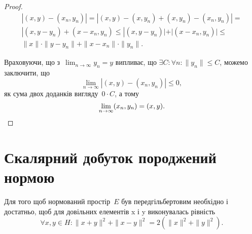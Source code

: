 \begin{proof}
\begin{multline*}
    |(x, y) - (x_n, y_n)| =
    |(x, y) - (x, y_n) + (x, y_n) - (x_n, y_n)| =  \\
    |(x, y - y_n) + (x - x_n, y_n) \le
    |(x, y - y_n)| + |(x - x_n, y_n)| \le \\
    \|x\| \cdot \|y - y_n\| + \|x - x_n\| \cdot \|y_n\|.
\end{multline*}

Враховуючи, що з~$\lim_{n \to \infty} y_n = y$ випливає, що 
$\exists C: \forall n: \|y_n\| \le C$, можемо заключити, що
\begin{equation*}
    \lim_{n \to \infty}  |(x, y) - (x_n, y_n)| \le 0,
\end{equation*}
як сума двох доданків вигляду~$0 \cdot C$, а тому
\begin{equation*}
    \lim_{n \to \infty} (x_n, y_n) = (x, y). \qedhere
\end{equation*}
\end{proof}

\section{Скалярний добуток породжений нормою}

\begin{proposition}
Для того щоб нормований простір~$E$ був передгільбертовим
необхідно і достатньо, щоб для
довільних елементів x і y виконувалась рівність
\begin{equation}
    \label{eq:16.1}
    \forall x, y \in H: \|x + y\|^2 + \|x - y\|^2 = 2 (\|x\|^2 + \|y\|^2).
\end{equation}
\end{proposition}

